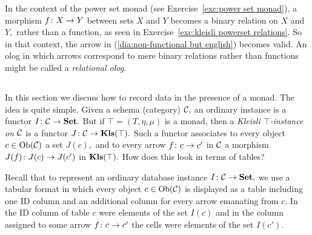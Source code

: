 \documentclass[../main/CT4S-EN-RU]{subfiles}
\begin{document}
\begin{blockRUS}
\end{blockRUS}

\begin{blockENG}
In the context of the power set monad (see Exercise~\ref{exc:power set monad}), a morphism $f\colon X\rightarrow Y$ between sets $X$ and $Y$ becomes a binary relation on $X$ and $Y,$ rather than a function, as seen in Exercise~\ref{exc:kleisli powerset relations}. So in that context, the arrow in (\ref{dia:non-functional but english}) becomes valid. An olog in which arrows correspond to mere binary relations rather than functions might be called a {\em relational olog}.
\end{blockENG}

\begin{blockRUS}
\end{blockRUS}


\subsection{}\label{sec:monads in db}

\begin{blockENG}
In this section we discuss how to record data in the presence of a monad. The idea is quite simple. Given a schema (category) $\mathcal{C},$ an ordinary instance is a functor $I\colon\mathcal{C}\rightarrow{\mathbf{Set}}.$ But if $\top=(T,\eta,\mu)$ is a monad, then a {\em Kleisli $\top$-instance on $\mathcal{C}$} is a functor $J\colon\mathcal{C}\rightarrow{\mathbf{Kls}}(\top).$ Such a functor associates to every object $c\in\operatorname{Ob}(\mathcal{C})$ a set $J(c),$ and to every arrow $f\colon c\rightarrow c'$ in $\mathcal{C}$ a morphism $J(f)\colon J(c)\rightarrow J(c')$ in ${\mathbf{Kls}}(\top).$ How does this look in terms of tables?
\end{blockENG}

\begin{blockRUS}
\end{blockRUS}

\begin{blockENG}
Recall that to represent an ordinary database instance $I\colon\mathcal{C}\rightarrow{\mathbf{Set}},$ we use a tabular format in which every object $c\in\operatorname{Ob}(\mathcal{C})$ is displayed as a table including one ID column and an additional column for every arrow emanating from $c.$ In the ID column of table $c$ were elements of the set $I(c)$ and in the column assigned to some arrow $f\colon c\rightarrow c'$ the cells were elements of the set $I(c').$ 
\end{blockENG}
\end{document}
